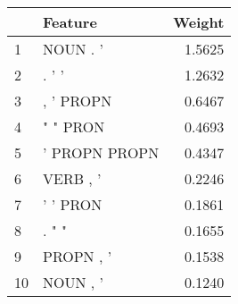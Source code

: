 \begin{tabular}{llr}
\toprule
{} &        Feature &  Weight \\
\midrule
1  &       NOUN . ' &  1.5625 \\
2  &          . ' ' &  1.2632 \\
3  &      , ' PROPN &  0.6467 \\
4  &       " " PRON &  0.4693 \\
5  &  ' PROPN PROPN &  0.4347 \\
6  &       VERB , ' &  0.2246 \\
7  &       ' ' PRON &  0.1861 \\
8  &          . " " &  0.1655 \\
9  &      PROPN , ' &  0.1538 \\
10 &       NOUN , ' &  0.1240 \\
\bottomrule
\end{tabular}

